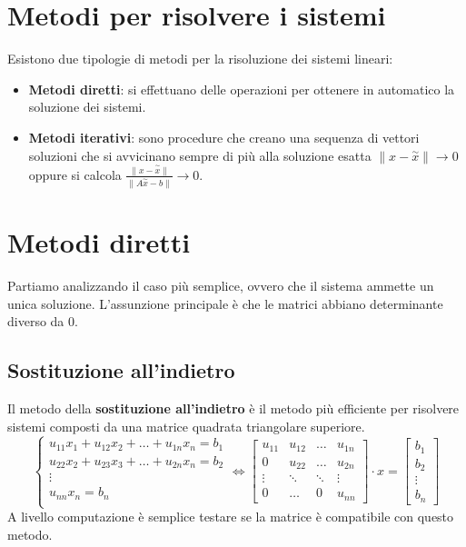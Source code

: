 \section{Metodi per risolvere i sistemi}
Esistono due tipologie di metodi per la risoluzione dei sistemi lineari:
\begin{itemize}
    \item \textbf{Metodi diretti}: si effettuano delle operazioni per ottenere
          in automatico la soluzione dei sistemi.
    \item \textbf{Metodi iterativi}: sono procedure che creano una sequenza di
          vettori soluzioni che si avvicinano sempre di più alla soluzione esatta
          $\|x -\stackrel{\sim}{x}\|\rightarrow 0$ oppure si calcola $\frac{\|x
                  -\stackrel{\sim}{x}\|}{\|A\stackrel{\sim}{x} - b\|}\rightarrow 0$.
\end{itemize}
\section{Metodi diretti}
Partiamo analizzando il caso più semplice, ovvero che il sistema ammette un unica
soluzione. L'assunzione principale è che le matrici abbiano determinante diverso
da $0$.
\subsection{Sostituzione all'indietro}
Il metodo della \textbf{sostituzione all'indietro} è il metodo più efficiente per
risolvere sistemi composti da una matrice quadrata triangolare superiore.
\begin{equation}
    \begin{cases}
        u_{11}x_1 + u_{12} x_2 + \dots + u_{1n} x_n= b_1 \\
        u_{22}x_2 + u_{23} x_3 + \dots + u_{2n} x_n= b_2 \\
        \vdots                                           \\
        u_{nn}x_n = b_n                                  \\
    \end{cases} \iff \left[\begin{array}{cccc}
            u_{11} & u_{12} & \dots  & u_{1n} \\
            0      & u_{22} & \dots  & u_{2n} \\
            \vdots & \ddots & \ddots & \vdots \\
            0      & \dots  & 0      & u_{nn}
        \end{array} \right] \cdot x = \left[\begin{array}{c}
            b_1    \\
            b_2    \\
            \vdots \\
            b_n
        \end{array}\right]
\end{equation}
A livello computazione è semplice testare se la matrice è compatibile con questo
metodo.

